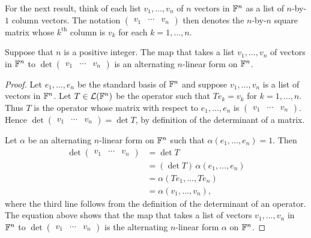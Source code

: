 For the next result, think of each list $v_1,\dots,v_n$ of $n$ vectors in
$\mathbb{F}^n$ as a list of $n$-by-$1$ column vectors. The notation
$\begin{pmatrix} v_1 & \cdots & v_n \end{pmatrix}$ then denotes the
$n$-by-$n$ square matrix whose $k^{\text{th}}$ column is $v_k$ for each
$k=1,\dots,n$.

\begin{result}\label{ax:9.45}
Suppose that $n$ is a positive integer. The map that takes a list
$v_1,\dots,v_n$ of vectors in $\mathbb{F}^n$ to
$\det\begin{pmatrix} v_1 & \cdots & v_n \end{pmatrix}$ is an alternating
$n$-linear form on $\mathbb{F}^n$.
\end{result}

\begin{proof}
Let $e_1,\dots,e_n$ be the standard basis of $\mathbb{F}^n$ and suppose
$v_1,\dots,v_n$ is a list of vectors in $\mathbb{F}^n$. Let $T\in\mathcal{L}(\mathbb{F}^n)$ be the
operator such that $Te_k=v_k$ for $k=1,\dots,n$. Thus $T$ is the operator whose
matrix with respect to $e_1,\dots,e_n$ is
$\begin{pmatrix} v_1 & \cdots & v_n \end{pmatrix}$. Hence
$\det\begin{pmatrix} v_1 & \cdots & v_n \end{pmatrix}=\det T$, by definition
of the determinant of a matrix.

Let $\alpha$ be an alternating $n$-linear form on $\mathbb{F}^n$ such that
$\alpha(e_1,\dots,e_n)=1$. Then
\begin{align*}
\det\begin{pmatrix} v_1 & \cdots & v_n \end{pmatrix} &= \det T\\
  &= (\det T)\,\alpha(e_1,\dots,e_n)\\
  &= \alpha(Te_1,\dots,Te_n)\\
  &= \alpha(v_1,\dots,v_n),
\end{align*}
where the third line follows from the definition of the determinant of an
operator. The equation above shows that the map that takes a list of vectors
$v_1,\dots,v_n$ in $\mathbb{F}^n$ to
$\det\begin{pmatrix} v_1 & \cdots & v_n \end{pmatrix}$ is the alternating
$n$-linear form $\alpha$ on $\mathbb{F}^n$.
\end{proof}

